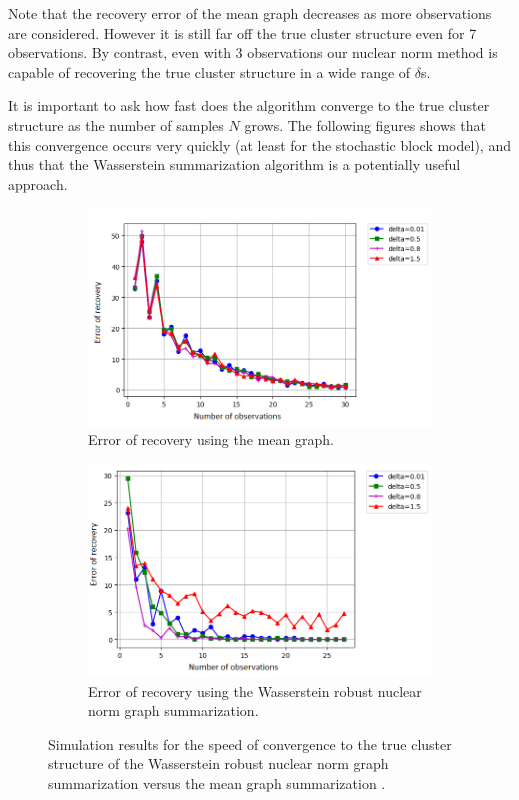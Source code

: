 \documentclass[12pt]{amsart}
\theoremstyle{remark}
\begin{document}
Note that the recovery error of the mean graph decreases as more observations are considered. However it is still far off the true cluster structure even for 7 observations. By contrast, even with 3 observations our nuclear norm method is capable of recovering the true cluster structure in a wide range of $\delta$s. 
  
It is important to ask how fast does  the algorithm converge to the true cluster structure as the number of samples $N$ grows. The following figures shows that this convergence occurs very quickly (at least for the stochastic block model), and thus that the Wasserstein summarization algorithm is a potentially useful approach.

\begin{figure}
     \centering
     \begin{subfigure}[b]{0.8\textwidth}
         \centering
         \includegraphics[width=\textwidth]{./Pictures/speedMean.PNG}
         \caption{Error of recovery using the mean graph.}
     \end{subfigure}
     \hfill
     \begin{subfigure}[b]{0.8\textwidth}
         \centering
         \includegraphics[width=\textwidth]{./Pictures/speedspectral.PNG}
         \caption{Error of recovery using the Wasserstein robust nuclear norm graph summarization.}
     \end{subfigure}
	\caption{Simulation results for the speed of convergence to the true cluster structure of the Wasserstein robust nuclear norm graph summarization versus the mean graph summarization .}
        \label{fig:speed}
\end{figure}
\end{document}
